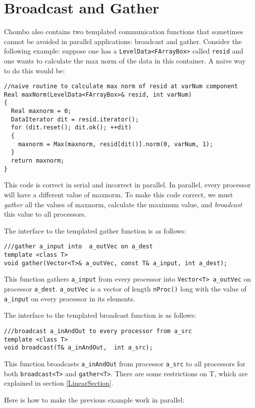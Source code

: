 \section{Broadcast and Gather}
\label{BroadcastGatherSection}

Chombo also contains two templated communication functions that 
sometimes cannot be avoided in parallel applications: broadcast
and gather.  Consider the following example:  suppose one has a 
\verb/LevelData<FArrayBox>/ called {\tt resid} 
and one wants to calculate the  max norm of the data in this
container.  A naive way to do this  would be:
\small \begin{verbatim}
//naive routine to calculate max norm of resid at varNum component
Real maxNorm(LevelData<FArrayBox>& resid, int varNum)
{
  Real maxnorm = 0;
  DataIterator dit = resid.iterator();
  for (dit.reset(); dit.ok(); ++dit)
  {      
    maxnorm = Max(maxnorm, resid[dit()].norm(0, varNum, 1);
  }
  return maxnorm;
}
\end{verbatim} \normalsize
This code is correct in serial and incorrect in parallel.  In
parallel, every processor will have a different value of maxnorm.
To make this code correct, we must {\it gather} all the values 
of maxnorm, calculate the maximum value, and {\it broadcast}
this value to all processors.  

The interface to the templated gather function is as follows:
\small \begin{verbatim}
///gather a_input into  a_outVec on a_dest
template <class T>
void gather(Vector<T>& a_outVec, const T& a_input, int a_dest);
\end{verbatim}\normalsize
This function gathers \verb/a_input/ from every processor into 
\verb/Vector<T> a_outVec/ on processor \verb/a_dest/. 
\verb/a_outVec/ is a vector of length \verb/nProc()/ long
with the value of \verb/a_input/   on every processor in its elements.

The interface to the templated broadcast function is as follows:
\small \begin{verbatim}
///broadcast a_inAndOut to every processor from a_src
template <class T>
void broadcast(T& a_inAndOut,  int a_src);
\end{verbatim}\normalsize
This function broadcasts \verb/a_inAndOut/ from 
processor \verb/a_src/ to all processors
for both \verb/broadcast<T>/ and \verb/gather<T>/.
There are some restrictions on T, which are explained in 
section \ref{LinearSection}.

Here is how to make the previous example work in
parallel:

